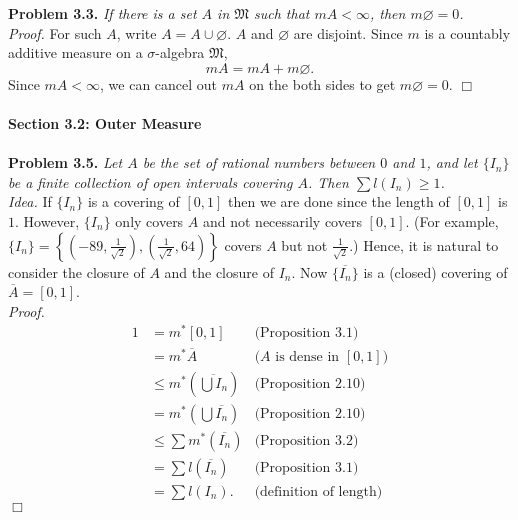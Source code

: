 \documentclass{article}
\begin{document}
\textbf{Problem 3.3.}
\emph{If there is a set $A$ in $\mathfrak{M}$ such that $mA < \infty$,
then $m\varnothing = 0$.} \\

\emph{Proof.}
For such $A$, write $A = A \cup \varnothing$.
$A$ and $\varnothing$ are disjoint.
Since $m$ is a countably additive measure
on a $\sigma$-algebra $\mathfrak{M}$,
$$mA = mA + m\varnothing.$$
Since $mA < \infty$,
we can cancel out $mA$ on the both sides to get
$m\varnothing = 0$.
$\Box$ \\\\






\textbf{\large Section 3.2: Outer Measure} \\\\



\textbf{Problem 3.5.}
\emph{Let $A$ be the set of rational numbers between $0$ and $1$, and
let $\{ I_n\}$ be a finite collection of open intervals covering $A$.
Then $\sum l(I_n) \geq 1$.} \\

\emph{Idea.}
If $\{ I_n\}$ is a covering of $[0, 1]$ then we are done
since the length of $[0, 1]$ is $1$.
However, $\{ I_n\}$ only covers $A$ and not necessarily covers $[0, 1]$.
(For example,
$\{ I_n\}
= \left\{
\left( -89, \frac{1}{\sqrt{2}} \right),
\left( \frac{1}{\sqrt{2}}, 64 \right)
\right\}$ covers $A$ but not $\frac{1}{\sqrt{2}}$.)
Hence, it is natural to consider the closure of $A$ and
the closure of $I_n$.
Now $\{ \overline{I_n} \}$ is a (closed) covering of
$\overline{A} = [0, 1]$. \\

\emph{Proof.}
\begin{align*}
1
&= m^{*}[0, 1]
  &\text{(Proposition 3.1)} \\
&= m^{*}\overline{A}
  &\text{($A$ is dense in $[0, 1]$)} \\
&\leq m^{*}\left( \overline{\bigcup I_n} \right)
  &\text{(Proposition 2.10)} \\
&= m^{*}\left( \bigcup \overline{I_n} \right)
  &\text{(Proposition 2.10)} \\
&\leq \sum m^{*}(\overline{I_n})
  &\text{(Proposition 3.2)} \\
&= \sum l(\overline{I_n})
  &\text{(Proposition 3.1)} \\
&= \sum l(I_n).
  &\text{(definition of length)}
\end{align*}
$\Box$ \\
\end{document}
